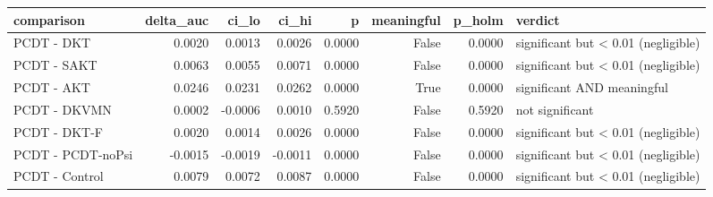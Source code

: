 \begin{tabular}{lrrrrrrl}
\toprule
comparison & delta\_auc & ci\_lo & ci\_hi & p & meaningful & p\_holm & verdict \\
\midrule
PCDT - DKT & 0.0020 & 0.0013 & 0.0026 & 0.0000 & False & 0.0000 & significant but < 0.01 (negligible) \\
PCDT - SAKT & 0.0063 & 0.0055 & 0.0071 & 0.0000 & False & 0.0000 & significant but < 0.01 (negligible) \\
PCDT - AKT & 0.0246 & 0.0231 & 0.0262 & 0.0000 & True & 0.0000 & significant AND meaningful \\
PCDT - DKVMN & 0.0002 & -0.0006 & 0.0010 & 0.5920 & False & 0.5920 & not significant \\
PCDT - DKT-F & 0.0020 & 0.0014 & 0.0026 & 0.0000 & False & 0.0000 & significant but < 0.01 (negligible) \\
PCDT - PCDT-noPsi & -0.0015 & -0.0019 & -0.0011 & 0.0000 & False & 0.0000 & significant but < 0.01 (negligible) \\
PCDT - Control & 0.0079 & 0.0072 & 0.0087 & 0.0000 & False & 0.0000 & significant but < 0.01 (negligible) \\
\bottomrule
\end{tabular}
